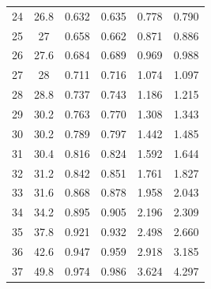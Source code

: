 \begin{table}[H]
\begin{tabular}{cccccc}
    24         & 26.8                      & 0.632                      & 0.635                       & 0.778                   & 0.790                   \\
    25         & 27                        & 0.658                      & 0.662                       & 0.871                   & 0.886                   \\
    26         & 27.6                      & 0.684                      & 0.689                       & 0.969                   & 0.988                   \\
    27         & 28                        & 0.711                      & 0.716                       & 1.074                   & 1.097                   \\
    28         & 28.8                      & 0.737                      & 0.743                       & 1.186                   & 1.215                   \\
    29         & 30.2                      & 0.763                      & 0.770                       & 1.308                   & 1.343                   \\
    30         & 30.2                      & 0.789                      & 0.797                       & 1.442                   & 1.485                   \\
    31         & 30.4                      & 0.816                      & 0.824                       & 1.592                   & 1.644                   \\
    32         & 31.2                      & 0.842                      & 0.851                       & 1.761                   & 1.827                   \\
    33         & 31.6                      & 0.868                      & 0.878                       & 1.958                   & 2.043                   \\
    34         & 34.2                      & 0.895                      & 0.905                       & 2.196                   & 2.309                   \\
    35         & 37.8                      & 0.921                      & 0.932                       & 2.498                   & 2.660                   \\
    36         & 42.6                      & 0.947                      & 0.959                       & 2.918                   & 3.185                   \\
    37         & 49.8                      & 0.974                      & 0.986                       & 3.624                   & 4.297        \\
    \bottomrule          
    \end{tabular}
    \end{table}
    
